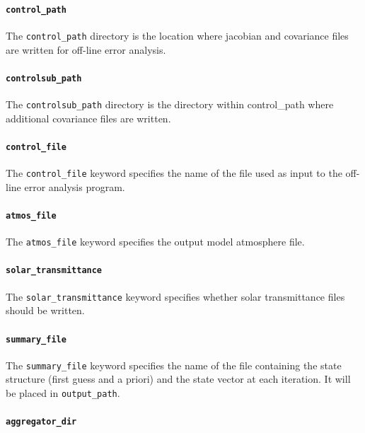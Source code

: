 \documentclass{article}
\begin{document}
\paragraph{\texttt{control\_path}}

The \texttt{control\_path} directory is the location where jacobian
and covariance files are written for off-line error analysis.

\paragraph{\texttt{controlsub\_path}}

The \texttt{controlsub\_path} directory is the directory within
control\_path where additional covariance files are written.

\paragraph{\texttt{control\_file}}

The \texttt{control\_file} keyword specifies the name of the file used
as input to the off-line error analysis program.

\paragraph{\texttt{atmos\_file}}

The \texttt{atmos\_file} keyword specifies the output model atmosphere file.

\paragraph{\texttt{solar\_transmittance}}

The \texttt{solar\_transmittance} keyword specifies whether solar
transmittance files should be written.

\paragraph{\texttt{summary\_file}}

The \texttt{summary\_file} keyword specifies the name of the file
containing the state structure (first guess and a priori) and the
state vector at each iteration.  It will be placed in
\texttt{output\_path}.

\paragraph{\texttt{aggregator\_dir}}
\end{document}
